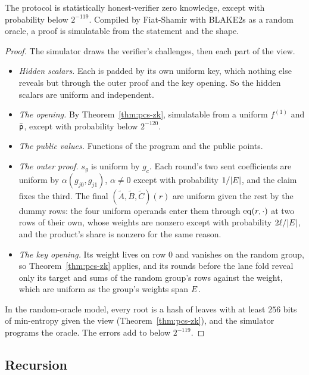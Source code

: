 \begin{theorem}\label{thm:zk}
The protocol is statistically honest-verifier zero knowledge, except with probability below $2^{-119}$. Compiled by Fiat-Shamir with BLAKE2s as a random oracle, a proof is simulatable from the statement and the shape.
\end{theorem}
\begin{proof}
The simulator draws the verifier's challenges, then each part of the view.
\begin{itemize}[itemsep=1pt,topsep=2pt]
\item \emph{Hidden scalars.} Each is padded by its own uniform key, which nothing else reveals but through the outer proof and the key opening. So the hidden scalars are uniform and independent.
\item \emph{The opening.} By Theorem~\ref{thm:pcs-zk}, simulatable from a uniform $f^{(1)}$ and $\bar{\mathsf{p}}$, except with probability below $2^{-120}$.
\item \emph{The public values.} Functions of the program and the public points.
\item \emph{The outer proof.} $s_g$ is uniform by $g_c$. Each round's two sent coefficients are uniform by $\alpha (g_{j0}, g_{j1})$, $\alpha \ne 0$ except with probability $1/|E|$, and the claim fixes the third. The final $(\tilde A, \tilde B, \tilde C)(r)$ are uniform given the rest by the dummy rows: the four uniform operands enter them through $\operatorname{eq}(r, \cdot)$ at two rows of their own, whose weights are nonzero except with probability $2\ell/|E|$, and the product's share is nonzero for the same reason.
\item \emph{The key opening.} Its weight lives on row $0$ and vanishes on the random group, so Theorem~\ref{thm:pcs-zk} applies, and its rounds before the lane fold reveal only its target and sums of the random group's rows against the weight, which are uniform as the group's weights span $E$.
\end{itemize}
In the random-oracle model, every root is a hash of leaves with at least $256$ bits of min-entropy given the view (Theorem~\ref{thm:pcs-zk}), and the simulator programs the oracle. The errors add to below $2^{-119}$.
\end{proof}

\subsection{Recursion}\label{zk:rec}

